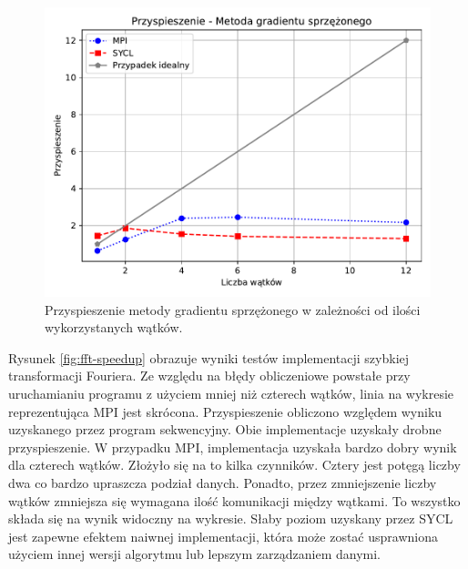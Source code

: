 \documentclass[a4paper,12pt]{book} %
\begin{document}
\begin{figure}
	\centering
	\includegraphics[scale=1]{assets/przyspieszenie_cg.pdf}
	\caption{Przyspieszenie metody gradientu sprzężonego w zależności od ilości wykorzystanych wątków.}
	\label{fig:cg-speedup}
\end{figure}

Rysunek \ref{fig:fft-speedup} obrazuje wyniki testów implementacji szybkiej transformacji Fouriera. Ze względu na błędy obliczeniowe powstałe przy uruchamianiu programu z użyciem mniej niż czterech wątków, linia na wykresie reprezentująca MPI jest skrócona. Przyspieszenie obliczono względem wyniku uzyskanego przez program sekwencyjny. Obie implementacje uzyskały drobne przyspieszenie. W przypadku MPI, implementacja uzyskała bardzo dobry wynik dla czterech wątków. Złożyło się na to kilka czynników. Cztery jest potęgą liczby dwa co bardzo upraszcza podział danych. Ponadto, przez zmniejszenie liczby wątków zmniejsza się wymagana ilość komunikacji między wątkami. To wszystko składa się na wynik widoczny na wykresie. Słaby poziom uzyskany przez SYCL jest zapewne efektem naiwnej implementacji, która może zostać usprawniona użyciem innej wersji algorytmu lub lepszym zarządzaniem danymi.
\end{document}
